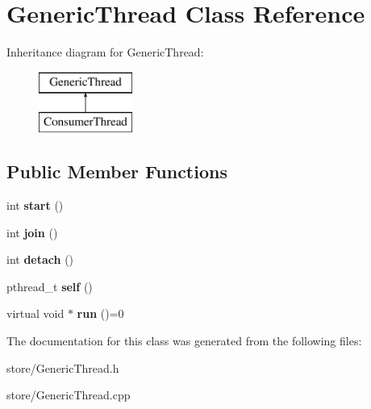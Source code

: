 \hypertarget{classGenericThread}{}\section{Generic\+Thread Class Reference}
\label{classGenericThread}
Inheritance diagram for Generic\+Thread\+:\begin{figure}[H]
\begin{center}
\leavevmode
\includegraphics[height=2.000000cm]{classGenericThread}
\end{center}
\end{figure}
\subsection*{Public Member Functions}
\begin{DoxyCompactItemize}
\item 
int {\bfseries start} ()\hypertarget{classGenericThread_ac1d8c3d7dcaae01e89c69093a065141f}{}\label{classGenericThread_ac1d8c3d7dcaae01e89c69093a065141f}

\item 
int {\bfseries join} ()\hypertarget{classGenericThread_a217ef41077ae00ce48372c03838af96a}{}\label{classGenericThread_a217ef41077ae00ce48372c03838af96a}

\item 
int {\bfseries detach} ()\hypertarget{classGenericThread_abd0849015ec4004b789aa3181853fbf6}{}\label{classGenericThread_abd0849015ec4004b789aa3181853fbf6}

\item 
pthread\+\_\+t {\bfseries self} ()\hypertarget{classGenericThread_a0ac1c8aa0c6f5d47d73626c13854d444}{}\label{classGenericThread_a0ac1c8aa0c6f5d47d73626c13854d444}

\item 
virtual void $\ast$ {\bfseries run} ()=0\hypertarget{classGenericThread_a54147ff9f16e7985e634b5f0d6d5b7f9}{}\label{classGenericThread_a54147ff9f16e7985e634b5f0d6d5b7f9}

\end{DoxyCompactItemize}


The documentation for this class was generated from the following files\+:\begin{DoxyCompactItemize}
\item 
store/Generic\+Thread.\+h\item 
store/Generic\+Thread.\+cpp\end{DoxyCompactItemize}
